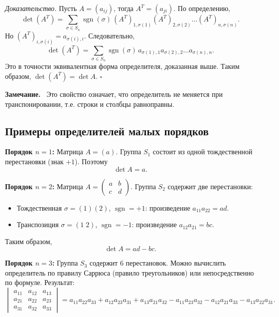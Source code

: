 \documentclass[a4paper,12pt]{article}
\newcommand{\myremark}{\textbf{Замечание.}\ }
\theoremstyle{definition}
\theoremstyle{plain}
\theoremstyle{remark}
\begin{document}
	\medskip
	\textit{Доказательство.}
	Пусть \( A = (a_{ij}) \), тогда \( A^T = (a_{ji}) \). По определению,
	\[
	\det(A^T) = \sum_{\sigma \in S_n} \operatorname{sgn}(\sigma) \, (A^T)_{1,\sigma(1)} (A^T)_{2,\sigma(2)} \dots (A^T)_{n,\sigma(n)}.
	\]
	Но \( (A^T)_{i,\sigma(i)} = a_{\sigma(i), i} \). Следовательно,
	\[
	\det(A^T) = \sum_{\sigma \in S_n} \operatorname{sgn}(\sigma) \, a_{\sigma(1),1} a_{\sigma(2),2} \dots a_{\sigma(n),n}.
	\]
	Это в точности эквивалентная форма определителя, доказанная выше. Таким образом, \( \det(A^T) = \det A \). \hfill \(\square\)
	
	\myremark
	Это свойство означает, что определитель не меняется при транспонировании, т.е. строки и столбцы равноправны.
	
	\subsection{Примеры определителей малых порядков}
	
	\textbf{Порядок \( n = 1 \):}
	Матрица \( A = (a) \). Группа \( S_1 \) состоит из одной тождественной перестановки (знак \( +1 \)). Поэтому
	\[
	\det A = a.
	\]
	
	\textbf{Порядок \( n = 2 \):}
	Матрица \( A = \begin{pmatrix} a & b \\ c & d \end{pmatrix} \). Группа \( S_2 \) содержит две перестановки:
	\begin{itemize}
		\item Тождественная \( \sigma = (1)(2) \), \( \operatorname{sgn}=+1 \): произведение \( a_{11} a_{22} = ad \).
		\item Транспозиция \( \sigma = (1\;2) \), \( \operatorname{sgn}=-1 \): произведение \( a_{12} a_{21} = bc \).
	\end{itemize}
	Таким образом,
	\[
	\det A = ad - bc.
	\]
	
	\textbf{Порядок \( n = 3 \):}
	Группа \( S_3 \) содержит 6 перестановок. Можно вычислить определитель по правилу Саррюса (правило треугольников) или непосредственно по формуле. Результат:
	\[
	\begin{vmatrix}
		a_{11} & a_{12} & a_{13} \\
		a_{21} & a_{22} & a_{23} \\
		a_{31} & a_{32} & a_{33}
	\end{vmatrix}
	= a_{11}a_{22}a_{33} + a_{12}a_{23}a_{31} + a_{13}a_{21}a_{32}
	- a_{11}a_{23}a_{32} - a_{12}a_{21}a_{33} - a_{13}a_{22}a_{31}.
	\]
	
\end{document}
